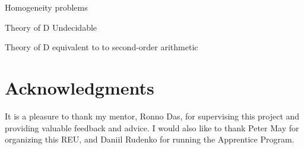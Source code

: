 \documentclass[psamsfonts]{amsart}
\theoremstyle{definition}
\theoremstyle{remark}
\numberwithin{equation}{section}
\begin{document}
Homogeneity problems

Theory of D Undecidable


Theory of D equivalent to to second-order arithmetic \cite{simpson77:_first_order_theor_degrees_recur_unsol}





\section*{Acknowledgments}
It is a pleasure to thank my mentor, Ronno Das, for supervising this project and
providing valuable feedback and advice. I would also like to thank Peter May for
organizing this REU, and Daniil Rudenko for running the Apprentice Program.

\printbibliography
\end{document}
